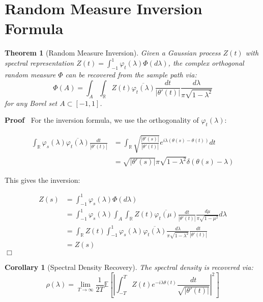 \documentclass{article}
\newenvironment{proof}{\noindent\textbf{Proof\ }}{\hspace*{\fill}$\Box$\medskip}
\newtheorem{corollary}{Corollary}
\newtheorem{theorem}{Theorem}
\begin{document}
\section{Random Measure Inversion Formula}

\begin{theorem}
  [Random Measure Inversion] Given a Gaussian process $Z (t)$ with spectral
  representation $Z (t) = \int_{- 1}^1 \varphi_t (\lambda) \Phi (d \lambda)$,
  the complex orthogonal random measure $\Phi$ can be recovered from the
  sample path via:
  \begin{equation}
    \boxed{\Phi (A) = \int_A \int_{\mathbb{R}} Z (t) \overline{\varphi_t
    (\lambda)} \frac{dt}{| \theta' (t) |}  \frac{d \lambda}{\pi \sqrt{1 -
    \lambda^2}}}
  \end{equation}
  for any Borel set $A \subset [- 1, 1]$.
\end{theorem}

\begin{proof}
  For the inversion formula, we use the orthogonality of $\varphi_t
  (\lambda)$:
  
  \begin{align}
    \int_{\mathbb{R}} \varphi_s (\lambda) \overline{\varphi_t (\lambda)}
    \frac{dt}{| \theta' (t) |} & = \int_{\mathbb{R}} \sqrt{\frac{| \theta' (s)
    |}{| \theta' (t) |}} e^{i \lambda (\theta (s) - \theta (t))} dt \\
    & = \sqrt{| \theta' (s) |} \pi \sqrt{1 - \lambda^2} \delta (\theta (s) -
    \lambda) 
  \end{align}
  
  This gives the inversion:
  
  \begin{align}
    Z (s) & = \int_{- 1}^1 \varphi_s (\lambda) \Phi (d \lambda) \\
    & = \int_{- 1}^1 \varphi_s (\lambda)  \int_A \int_{\mathbb{R}} Z (t)
    \overline{\varphi_t (\mu)} \frac{dt}{| \theta' (t) |}  \frac{d \mu}{\pi
    \sqrt{1 - \mu^2}} d \lambda \\
    & = \int_{\mathbb{R}} Z (t)  \int_{- 1}^1 \varphi_s (\lambda)
    \overline{\varphi_t (\lambda)} \frac{d \lambda}{\pi \sqrt{1 - \lambda^2}} 
    \frac{dt}{| \theta' (t) |} \\
    & = Z (s) 
  \end{align}
\end{proof}

\begin{corollary}
  [Spectral Density Recovery] The spectral density is recovered via:
  \begin{equation}
    \rho (\lambda) = \lim_{T \to \infty}  \frac{1}{2 T} \mathbb{E} \left[
    \left| \int_{- T}^T Z (t) e^{- i \lambda \theta (t)}  \frac{dt}{\sqrt{|
    \theta' (t) |}} \right|^2 \right]
  \end{equation}
\end{corollary}
\end{document}
